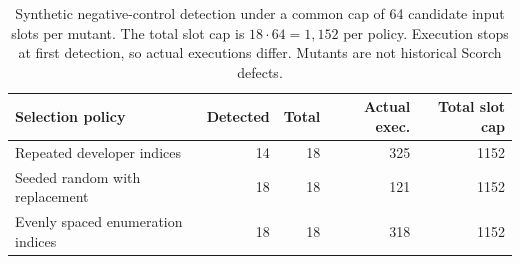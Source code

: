\begin{table}[t]
\caption{Synthetic negative-control detection under a common cap of 64 candidate input slots per mutant. The total slot cap is $18\cdot64=1{,}152$ per policy. Execution stops at first detection, so actual executions differ. Mutants are not historical Scorch defects.}\label{tab:mutation}
\centering
\begin{tabular}{lrrrr}
\toprule
Selection policy & Detected & Total & Actual exec. & Total slot cap\\\midrule
Repeated developer indices & 14 & 18 & 325 & 1152\\
Seeded random with replacement & 18 & 18 & 121 & 1152\\
Evenly spaced enumeration indices & 18 & 18 & 318 & 1152\\
\bottomrule
\end{tabular}
\end{table}
